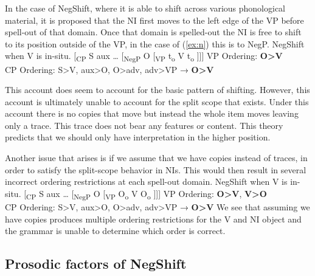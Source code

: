 \documentclass[12pt, letterpaper]{article}
\begin{document}
In the case of NegShift, where it is able to shift across various phonological material, it is proposed that the NI first moves to the left edge of the VP before spell-out of that domain. Once that domain is spelled-out the NI is free to shift to its position outside of the VP, in the case of (\ref{ex:n}) this is to NegP.
	\ea NegShift when V is in-situ. \label{ex:n}
		\ea {}[\textsubscript{CP} S aux … [\textsubscript{NegP} O [\textsubscript{VP} t\textsubscript{o}  V t\textsubscript{o} ]]]
		\ex VP Ordering: \textbf{O>V}\\
		CP Ordering: S>V, aux>O, O>adv, adv>VP → \textbf{O>V}
		\z 
	\z

This account does seem to account for the basic pattern of shifting. However, this account is ultimately unable to account for the split scope that exists. Under this account there is no copies that move but instead the whole item moves leaving only a trace. This trace does not bear any features or content. This theory predicts that we should only have interpretation in the higher position. 

Another issue that arises is if we assume that we have copies instead of traces, in order to satisfy the split-scope behavior in NIs. This would then result in several incorrect ordering restrictions at each spell-out domain.
	\ea NegShift when V is in-situ. \label{ex:VInSitu}
		\ea {}[\textsubscript{CP} S aux … [\textsubscript{NegP} O [\textsubscript{VP} O\textsubscript{o}  V O\textsubscript{o} ]]]
		\ex VP Ordering: \textbf{O>V}, \textbf{V>O}\\
		CP Ordering: S>V, aux>O, O>adv, adv>VP → \textbf{O>V}
		\z 
	\z
We see that assuming we have copies produces multiple ordering restrictions for the V and NI object and the grammar is unable to determine which order is correct. 

\subsection{Prosodic factors of NegShift} \label{sec:Confound}
\end{document}
